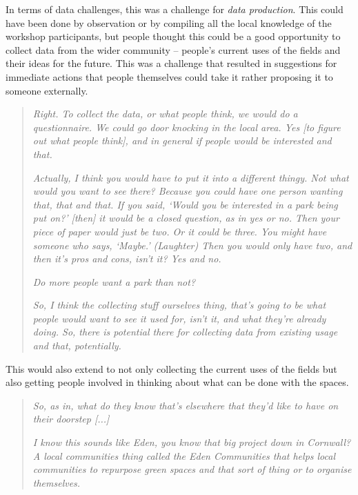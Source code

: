 In terms of data challenges, this was a challenge for \textit{data production}. This could have been done by observation or by compiling all the local knowledge of the workshop participants, but people thought this could be a good opportunity to collect data from the wider community -- people's current uses of the fields and their ideas for the future. This was a challenge that resulted in suggestions for immediate actions that people themselves could take it rather proposing it to someone externally.
\begin{quote}
    \textit{Right. To collect the data, or what people think, we would do a questionnaire. We could go door knocking in the local area. Yes [to figure out what people think], and in general if people would be interested and that.}
    
    \textit{Actually, I think you would have to put it into a different thingy. Not what would you want to see there? Because you could have one person wanting that, that and that. If you said, `Would you be interested in a park being put on?' [then] it would be a closed question, as in yes or no. Then your piece of paper would just be two. Or it could be three. You might have someone who says, `Maybe.' (Laughter) Then you would only have two, and then it's pros and cons, isn't it? Yes and no.}
    
    \textit{Do more people want a park than not?}
    
    \textit{So, I think the collecting stuff ourselves thing, that's going to be what people would want to see it used for, isn't it, and what they're already doing. So, there is potential there for collecting data from existing usage and that, potentially.}
\end{quote}

This would also extend to not only collecting the current uses of the fields but also getting people involved in thinking about what can be done with the spaces.
\begin{quote}
    \textit{So, as in, what do they know that's elsewhere that they'd like to have on their doorstep [...]}
 
    \textit{I know this sounds like Eden, you know that big project down in Cornwall? A local communities thing called the Eden Communities that helps local communities to repurpose green spaces and that sort of thing or to organise themselves.}
\end{quote}

